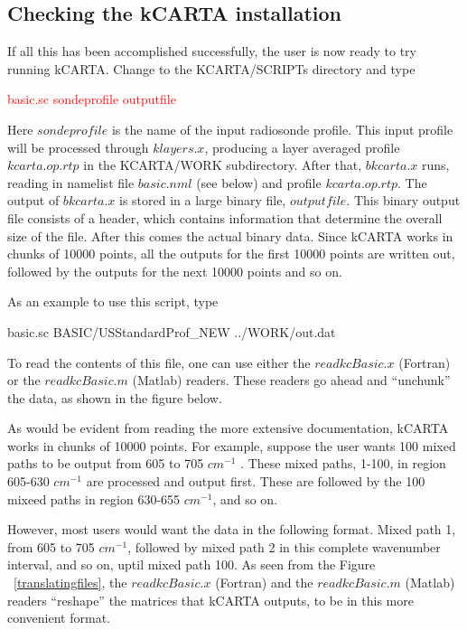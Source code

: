 \documentclass[12pt]{article}
\newcommand{\kc}{\textsf{kCARTA}\xspace}
\begin{document}
\subsection{Checking the \kc installation}

If all this has been accomplished successfully, the user is now ready to try 
running \kc. Change to the KCARTA/SCRIPTs directory and type \\
\begin{center}
\textcolor{red} {basic.sc sondeprofile outputfile}
\end{center}

Here $sondeprofile$ is the name of the input radiosonde profile. 
This input profile will be processed through $klayers.x$, producing a layer
averaged profile $kcarta.op.rtp$ in the KCARTA/WORK subdirectory. After that,
$bkcarta.x$ runs, reading in namelist file $basic.nml$ (see below) and profile
$kcarta.op.rtp$. The output of $bkcarta.x$ is stored in a large binary file,
$outputfile$.  This binary output file consists of a header, which
contains information that determine the overall size of the file. After this 
comes the actual binary data. Since \kc works in chunks of 10000 points, 
all the outputs for the first 10000 points are written out, followed by the
outputs for the next 10000 points and so on. 

As an example to use this script, type 
\begin{center}
basic.sc BASIC/USStandardProf\_NEW ../WORK/out.dat
\end{center}

To read the contents of this file, one can use either the $readkcBasic.x$ 
(Fortran) or the $readkcBasic.m$ (Matlab) readers. These readers go ahead 
and ``unchunk'' the data, as shown in the figure below. 

As would be evident from reading the more extensive documentation, \kc works 
in chunks of 10000 points. For example, suppose the user wants 100 mixed 
paths to be output from 605 to 705 $cm^{-1}$ . These mixed paths, 1-100, in 
region 605-630 $cm^{-1}$ are processed and output first. These are followed 
by the 100 mixeed paths in region 630-655 $cm^{-1}$, and so on.

However, most users would want the data in the following format. Mixed path 
1, from 605 to 705 $cm^{-1}$, followed by mixed path 2 in this complete 
wavenumber interval, and so on, uptil mixed path 100. As seen from the 
Figure ~\ref{translatingfiles}, the  $readkcBasic.x$ (Fortran) and the 
$readkcBasic.m$ (Matlab) readers ``reshape'' the matrices that \kc outputs, 
to be in this more convenient format.
\end{document}
